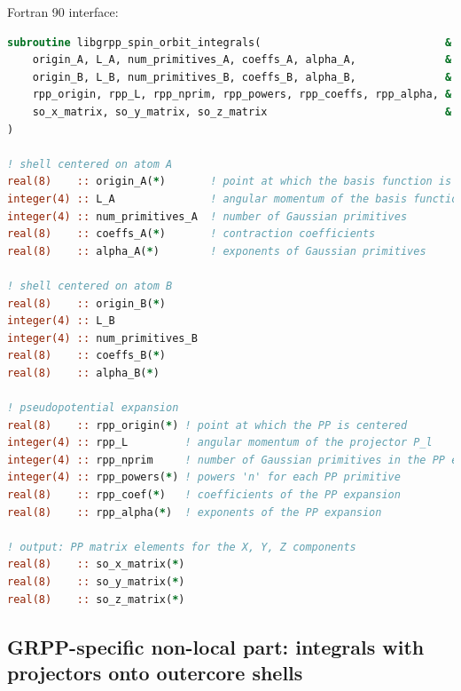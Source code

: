 \documentclass[12pt]{article}
\begin{document}
Fortran 90 interface:
\begin{lstlisting}[language=Fortran]
subroutine libgrpp_spin_orbit_integrals(                             &
    origin_A, L_A, num_primitives_A, coeffs_A, alpha_A,              &
    origin_B, L_B, num_primitives_B, coeffs_B, alpha_B,              &
    rpp_origin, rpp_L, rpp_nprim, rpp_powers, rpp_coeffs, rpp_alpha, &
    so_x_matrix, so_y_matrix, so_z_matrix                            &
)

! shell centered on atom A
real(8)    :: origin_A(*)       ! point at which the basis function is centered
integer(4) :: L_A               ! angular momentum of the basis function
integer(4) :: num_primitives_A  ! number of Gaussian primitives
real(8)    :: coeffs_A(*)       ! contraction coefficients
real(8)    :: alpha_A(*)        ! exponents of Gaussian primitives

! shell centered on atom B
real(8)    :: origin_B(*)
integer(4) :: L_B
integer(4) :: num_primitives_B
real(8)    :: coeffs_B(*)
real(8)    :: alpha_B(*)

! pseudopotential expansion
real(8)    :: rpp_origin(*) ! point at which the PP is centered
integer(4) :: rpp_L         ! angular momentum of the projector P_l
integer(4) :: rpp_nprim     ! number of Gaussian primitives in the PP expansion
integer(4) :: rpp_powers(*) ! powers 'n' for each PP primitive
real(8)    :: rpp_coef(*)   ! coefficients of the PP expansion
real(8)    :: rpp_alpha(*)  ! exponents of the PP expansion

! output: PP matrix elements for the X, Y, Z components
real(8)    :: so_x_matrix(*)
real(8)    :: so_y_matrix(*)
real(8)    :: so_z_matrix(*)
\end{lstlisting}



\subsection{GRPP-specific non-local part: integrals with projectors onto outercore shells}
\end{document}

